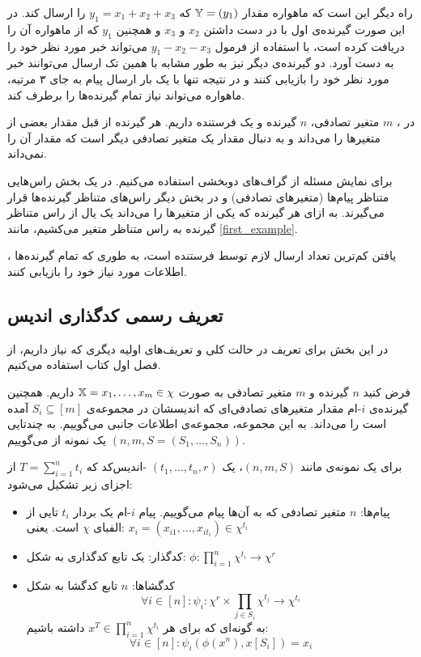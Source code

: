 راه دیگر این است که ماهواره مقدار
$\mathbb{Y} = (y_1)$
که
$y_1 = x_1 + x_2 + x_3$
را ارسال کند. در این صورت گیرنده‌ی اول با در دست داشتن
$x_2$
و
$x_3$
و همچنین
$y_1$
که از ماهواره آن را دریافت کرده است، با استفاده از فرمول
$y_1 - x_2 - x_3$
می‌تواند خبر مورد نظر خود را به دست آورد. دو گیرنده‌ی دیگر نیز به طور مشابه با همین تک ارسال می‌توانند خبر مورد نظر خود را بازیابی کنند و در نتیجه تنها با یک بار ارسال پیام به جای ۳ مرتبه، ماهواره می‌تواند نیاز تمام گیرنده‌ها را برطرف کند.

در 
\icods،
$m$
متغیر تصادفی،
$n$
گیرنده و یک فرستنده داریم. هر گیرنده از قبل مقدار بعضی از متغیرها را می‌داند و به دنبال مقدار یک متغیر تصادفی دیگر است که مقدار آن را نمی‌داند.

برای نمایش مسئله از گراف‌های دوبخشی استفاده می‌کنیم. در یک بخش راس‌هایی متناظر پیام‌ها (متغیرهای تصادفی) و در بخش دیگر راس‌های متناظر گیرنده‌ها قرار می‌گیرند. به ازای هر گیرنده که یکی از متغیرها را می‌داند یک یال از راس متناظر گیرنده به راس متناظر متغیر می‌کشیم، مانند \autoref{first_example}.

\icods،
یافتن کم‌ترین تعداد ارسال لازم توسط فرستنده است، به طوری که تمام گیرنده‌ها اطلاعات مورد نیاز خود را بازیابی کنند.
	\subsection{تعریف رسمی کدگذاری اندیس}
در این بخش برای تعریف 
\icod
در حالت کلی و تعریف‌های اولیه دیگری که نیاز داریم، از فصل اول کتاب
\cite{fatemehbook}
استفاده می‌کنیم.
\begin{definition}[\icods]
	فرض کنید
	$n$
	گیرنده و
	$m$
	متغیر تصادفی به صورت
	$\mathbb{X} = x_1, \ldots, x_m \in \chi$
	داریم. همچنین گیرنده‌ی
	$i$-ام
	مقدار متغیرهای تصادفی‌ای که اندیسشان در مجموعه‌ی
	$S_i \subseteq [m]$
	آمده است را می‌داند.	به این مجموعه، مجموعه‌ی اطلاعات جانبی می‌گوییم. به چندتایی
	$(n, m, S =(S_1, \ldots, S_n) )$
	یک نمونه از
	\icod
	می‌گوییم.
\end{definition}
\begin{definition}[اندیس‌کد]
	\label{def:icod}
	برای یک نمونه‌ی \icod مانند
	$(n, m, S)$،
	یک
	$(t_1, \ldots, t_n, r)$
	-اندیس‌کد که
	$T = \sum_{i = 1}^{n} t_i$
	 از اجزای زیر تشکیل می‌شود:
	\begin{itemize}
		\item 
      پیام‌ها:
		$n$
		 متغیر تصادفی که به آن‌ها پیام می‌گوییم. پیام
		  $i$-ام
            یک بردار 
		  $t_i$ تایی
            از الفبای
		  $\chi$
		  است. یعنی:
		  $x_i = (x_{i1}, \ldots, x_{it_i}) \in \chi^{t_i}$
		  \item
		  کدگذار:
		   یک تابع کدگذاری به شکل:
		   $\phi: \prod\limits_{i = 1}^n \chi^{t_i}  \rightarrow \chi^r$
		  \item
		  کدگشاها:
		  $n$
		  تابع کدگشا به شکل
		  $$\forall i \in [n]: \psi_i: \chi^r \times  \prod\limits_{j \in S_i} \chi^{t_j} \rightarrow \chi^{t_i}$$
		  به گونه‌ای که برای هر
		  $x^T \in \prod\limits_{i = 1}^{n} \chi^{t_i}$
		  داشته باشیم:
		  $$\forall i \in [n]: \psi_i(\phi(x^n), x[S_i]) = x_i$$
	\end{itemize}
\end{definition}

